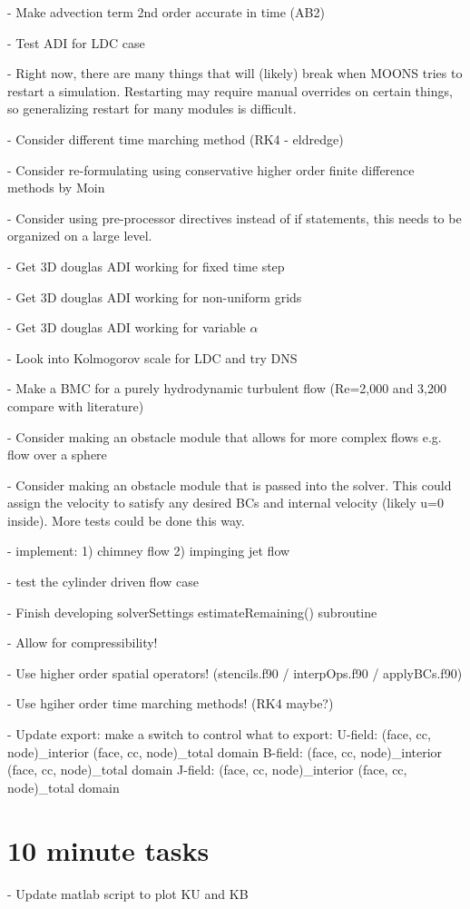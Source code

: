 \documentclass[3p,twocolumn,10pt]{elsarticle}
\begin{document}
- Make advection term 2nd order accurate in time (AB2)

- Test ADI for LDC case

- Right now, there are many things that will (likely) break when MOONS tries to restart a simulation. Restarting may require manual overrides on certain things, so generalizing restart for many modules is difficult.

- Consider different time marching method (RK4 - eldredge)

- Consider re-formulating using conservative higher order finite difference methods by Moin

- Consider using pre-processor directives instead of if statements, this needs to be organized on a large level.

- Get 3D douglas ADI working for fixed time step

- Get 3D douglas ADI working for non-uniform grids

- Get 3D douglas ADI working for variable $\alpha$

- Look into Kolmogorov scale for LDC and try DNS

- Make a BMC for a purely hydrodynamic turbulent flow (Re=2,000 and 3,200 compare with literature)

- Consider making an obstacle module that allows for more complex flows
e.g. flow over a sphere

- Consider making an obstacle module that is passed into the solver.
This could assign the velocity to satisfy any desired BCs and internal
velocity (likely u=0 inside). More tests could be done this way.

- implement: 1) chimney flow 2) impinging jet flow

- test the cylinder driven flow case

- Finish developing solverSettings estimateRemaining() subroutine

- Allow for compressibility!

- Use higher order spatial operators! (stencils.f90 / interpOps.f90 / applyBCs.f90)

- Use hgiher order time marching methods! (RK4 maybe?)

- Update export: make a switch to control what to export:
      U-field: (face, cc, node)\_interior (face, cc, node)\_total domain
      B-field: (face, cc, node)\_interior (face, cc, node)\_total domain
      J-field: (face, cc, node)\_interior (face, cc, node)\_total domain

\section{10 minute tasks}
- Update matlab script to plot KU and KB
\end{document}
